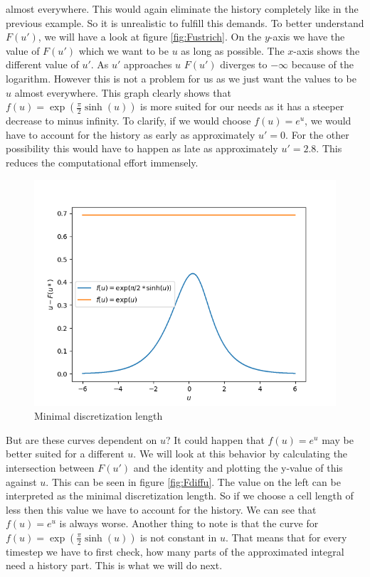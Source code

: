 \documentclass[12pt,a4paper,twoside, open=right]{scrreprt}
\theoremstyle{definition}
\theoremstyle{plain}
\begin{document}
almost everywhere. This would again eliminate the history completely like in the previous example. So it is unrealistic to fulfill this demands. To better understand $F(u')$, we will have a look at figure \ref{fig:Fustrich}. On the $y$-axis we have the value of $F(u')$ which we want to be $u$ as long as possible. The $x$-axis shows the different value of $u'$. As $u'$ approaches $u$ $F(u')$ diverges to $-\infty$ because of the logarithm. However this is not a problem for us as we just want the values to be $u$ almost everywhere. This graph clearly shows that $f(u)=\exp(\frac{\pi}{2}\sinh(u))$ is more suited for our needs as it has a steeper decrease to minus infinity. To clarify, if we would choose $f(u)=e^u$, we would have to account for the history as early as approximately $u'=0$. For the other possibility this would have to happen as late as approximately $u'=2.8$. This reduces the computational effort immensely.
\par 
\begin{figure}[htb]
    \centering
    \includegraphics[width=\textwidth]{Fdiffu}
    \caption{Minimal discretization length}
\end{figure}
But are these curves dependent on $u$? It could happen that $f(u)=e^u$ may be better suited for a different $u$. We will look at this behavior by calculating the intersection between $F(u')$ and the identity and plotting the y-value of this against $u$. This can be seen in figure \ref{fig:Fdiffu}. The value on the left can be interpreted as the minimal discretization length. So if we choose a cell length of less then this value we have to account for the history.  We can see that $f(u)=e^u$ is always worse. Another thing to note is that the curve for $f(u)=\exp(\frac{\pi}{2}\sinh(u))$ is not constant in $u$. That means that for every timestep we have to first check, how many parts of the approximated integral need a history part. This is what we will do next.
\end{document}
